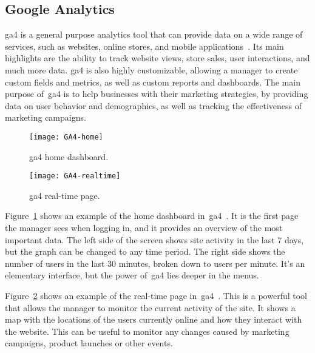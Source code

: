 \subsection{Google Analytics}\label{subsec:google-analytics}

\acrfull{ga4} is a general purpose analytics tool that can provide data on a wide range of services, such as websites,
online stores, and mobile applications~\cite{ga4}.
Its main highlights are the ability to track website views, store sales, user interactions, and much more data.
\acrshort{ga4} is also highly customizable, allowing a manager to create custom fields and metrics, as well as custom
reports and dashboards.
The main purpose of~\acrshort{ga4} is to help businesses with their marketing strategies, by providing data on user
behavior and demographics, as well as tracking the effectiveness of marketing campaigns.

\begin{figure}[H]
    \centering
    \texttt{[image: GA4-home]}
    \caption{\acrshort{ga4} home dashboard.
    }\label{fig:GA4-dashboard}
\end{figure}

\begin{figure}[H]
    \centering
    \texttt{[image: GA4-realtime]}
    \caption{\acrshort{ga4} real-time page.
    }\label{fig:GA4-realtime}
\end{figure}

Figure~\ref{fig:GA4-dashboard} shows an example of the home dashboard in~\acrshort{ga4}~\cite{ga4-interface}.
It is the first page the manager sees when logging in, and it provides an overview of the most important data.
The left side of the screen shows site activity in the last 7 days, but the graph can be changed to any time period.
The right side shows the number of users in the last 30 minutes, broken down to users per minute.
It's an elementary interface, but the power of~\acrshort{ga4} lies deeper in the menus.

Figure~\ref{fig:GA4-realtime} shows an example of the real-time page in~\acrshort{ga4}~\cite{ga4-realtime}.
This is a powerful tool that allows the manager to monitor the current activity of the site.
It shows a map with the locations of the users currently online and how they interact with the website.
This can be useful to monitor any changes caused by marketing campaigns, product launches or other events.

